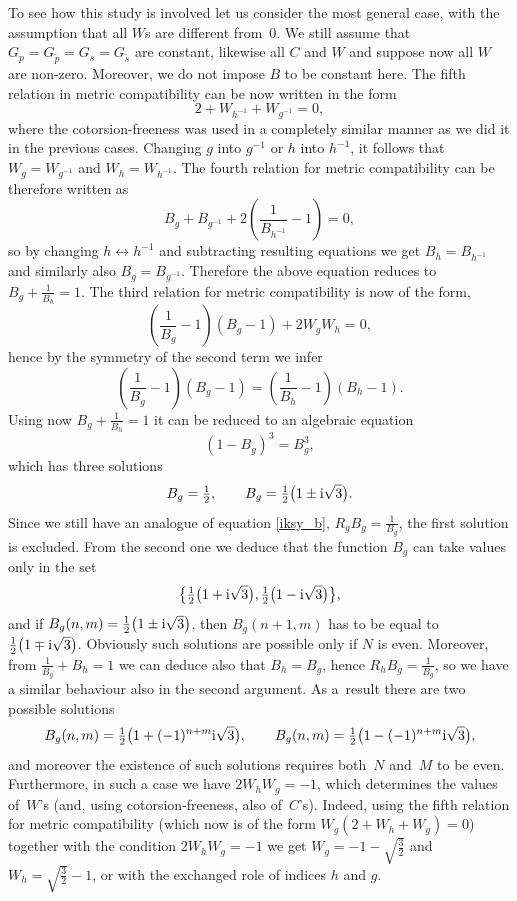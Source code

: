 \documentclass[pdftex]{sigma}
\numberwithin{equation}{section}
\newcommand{\ip}{{\tilde{p}}}
\newcommand{\is}{{\tilde{s}}}
\begin{document}
To see how this study is involved let us consider the most general case, with the assumption that all $W$s are different
from~$0$. We still assume that $G_p=G_\ip = G_s=G_\is$ are constant, likewise all $C$ and $W$ and suppose now all $W$ are
non-zero. Moreover, we do not impose $B$ to be constant here. The fifth relation in metric compatibility can be now written in the form
\begin{equation*}%
 2+W_{h^{-1}}+W_{g^{-1}}=0,
\end{equation*}
where the cotorsion-freeness was used in a completely similar manner as we did it in the previous cases. Changing $g$ into $g^{-1}$ or $h$ into $h^{-1}$, it follows that $W_g=W_{g^{-1}}$ and $W_{h}=W_{h^{-1}}$. The fourth relation for metric compatibility can be therefore written as
\[ B_g + B_{g^{-1}}+2\left(\frac{1}{B_{h^{-1}}}-1\right)=0, \] so by changing $h\leftrightarrow h^{-1}$ and subtracting resulting equations
we get $B_h=B_{h^{-1}}$ and similarly also $B_g=B_{g^{-1}}$. Therefore the above equation reduces to $B_g+\frac{1}{B_h}=1$.
The third relation for metric compatibility is now of the form,
\begin{equation*}%
\left(\frac{1}{B_g}-1\right)(B_g-1)+2W_gW_h=0,
\end{equation*}
hence by the symmetry of the second term we infer
\[ \left(\frac{1}{B_g}-1\right)(B_g-1)=\left(\frac{1}{B_h}-1\right)(B_h-1).\]
Using now $B_g+\frac{1}{B_h}=1$ it can be reduced to an algebraic equation
\[(1-B_g)^3=B_g^3,\]
which has three solutions
\[ B_g=\tfrac{1}{2}, \qquad B_g=\tfrac{1}{2}\big(1\pm {\rm i}\sqrt{3}\big).\]
Since we still have an analogue of equation \eqref{iksy_b}, $R_gB_g=\frac{1}{B_g}$, the first solution is excluded. From the second one we deduce that the function $B_g$ can take values only in the set
\[ \big\{\tfrac{1}{2}\big(1+ {\rm i}\sqrt{3}\big), \tfrac{1}{2}\big(1- {\rm i}\sqrt{3}\big)\big\},\] and if $B_g(n,m)=\frac{1}{2}\big(1\pm {\rm i}\sqrt{3}\big)$, then $B_g(n+1,m)$ has to be equal to $\frac{1}{2}\big(1\mp {\rm i}\sqrt{3}\big)$. Obviously such solutions are possible only if $N$ is even. Moreover, from $\frac{1}{B_g}+B_h=1$ we can deduce also that $B_h=B_g$, hence $R_hB_g=\frac{1}{B_g}$, so we have a similar behaviour also in the second argument. As a~result there are two possible solutions
\[ B_g(n,m)=\tfrac{1}{2}\big(1+(-1)^{n+m}{\rm i}\sqrt{3}\big),\qquad B_g(n,m)=\tfrac{1}{2}\big(1-(-1)^{n+m}{\rm i}\sqrt{3}\big),\]
and moreover the existence of such solutions requires both~$N$ and~$M$ to be even. Furthermore, in such a case we have $2W_hW_g=-1$, which determines the values of~$W$'s (and, using cotorsion-freeness, also of~$C$'s). Indeed, using the fifth relation for metric compatibility (which now is of the form $W_g(2+W_h+W_g)=0$) together with the condition $2W_hW_g=-1$ we get $W_g=-1-\sqrt{\frac{3}{2}}$ and $W_h=\sqrt{\frac{3}{2}}-1$, or with the exchanged role of indices $h$ and $g$.
\end{document}
